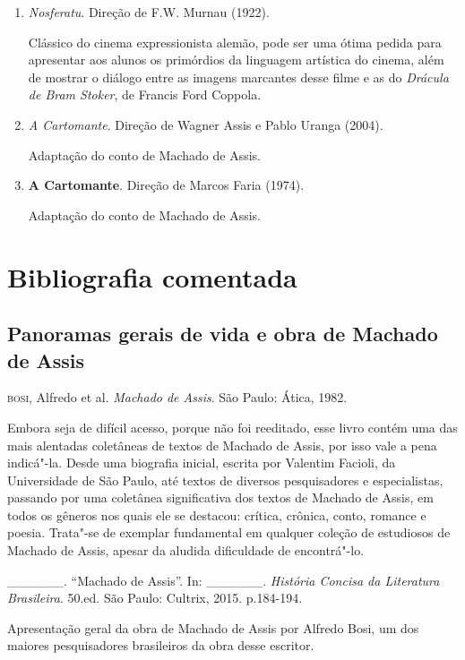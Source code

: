\documentclass{extarticle}
\begin{document}
\begin{enumerate}
\item\textit{Nosferatu}. Direção de F.W. Murnau (1922).

Clássico do cinema expressionista alemão, pode ser uma ótima pedida para
apresentar aos alunos os primórdios da linguagem artística do cinema,
além de mostrar o diálogo entre as imagens marcantes desse filme e as do
\emph{Drácula de Bram Stoker}, de Francis Ford Coppola.

\item\textit{A Cartomante}. Direção de Wagner Assis e Pablo Uranga (2004).

Adaptação do conto de Machado de Assis.

\item\textbf{A Cartomante}. Direção de Marcos Faria (1974).

Adaptação do conto de Machado de Assis.

\end{enumerate}

\section{Bibliografia comentada}

\subsection{Panoramas gerais de vida e obra de Machado de Assis}

\textsc{bosi}, Alfredo et al. \textit{Machado de Assis}. São Paulo: Ática, 1982.

Embora seja de difícil acesso, porque não foi reeditado, esse livro
contém uma das mais alentadas coletâneas de textos de Machado de Assis,
por isso vale a pena indicá"-la. Desde uma biografia inicial, escrita por
Valentim Facioli, da Universidade de São Paulo, até textos de diversos
pesquisadores e especialistas, passando por uma coletânea significativa
dos textos de Machado de Assis, em todos os gêneros nos quais ele se
destacou: crítica, crônica, conto, romance e poesia. Trata"-se de
exemplar fundamental em qualquer coleção de estudiosos de Machado de
Assis, apesar da aludida dificuldade de encontrá"-lo.

\_\_\_\_\_\_. ``Machado de Assis''. In: \_\_\_\_\_\_. \textit{História
Concisa da Literatura Brasileira}. 50.ed. São Paulo: Cultrix, 2015.
p.184-194.

Apresentação geral da obra de Machado de Assis por Alfredo Bosi, um dos
maiores pesquisadores brasileiros da obra desse escritor.
\end{document}

